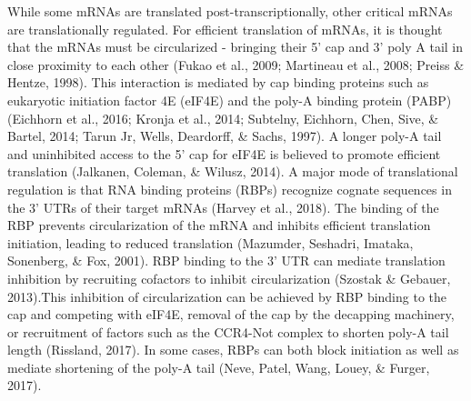 \documentclass[12pt,oneside]{reedthesis}
\begin{document}
While some mRNAs are translated post-transcriptionally, other critical
mRNAs are translationally regulated. For efficient translation of mRNAs,
it is thought that the mRNAs must be circularized - bringing their 5'
cap and 3' poly A tail in close proximity to each other (Fukao et al., 2009; Martineau et al., 2008; Preiss \& Hentze, 1998). This interaction is mediated by cap
binding proteins such as eukaryotic initiation factor 4E (eIF4E) and the
poly-A binding protein (PABP)(Eichhorn et al., 2016; Kronja et al., 2014; Subtelny, Eichhorn, Chen, Sive, \& Bartel, 2014; Tarun Jr, Wells, Deardorff, \& Sachs, 1997). A longer poly-A tail and uninhibited
access to the 5' cap for eIF4E is believed to promote efficient
translation (Jalkanen, Coleman, \& Wilusz, 2014). A major mode of translational
regulation is that RNA binding proteins (RBPs) recognize cognate
sequences in the 3' UTRs of their target mRNAs (Harvey et al., 2018). The
binding of the RBP prevents circularization of the mRNA and inhibits
efficient translation initiation, leading to reduced translation
(Mazumder, Seshadri, Imataka, Sonenberg, \& Fox, 2001). RBP binding to the 3' UTR can mediate translation
inhibition by recruiting cofactors to inhibit circularization
(Szostak \& Gebauer, 2013).This inhibition of circularization can be achieved by
RBP binding to the cap and competing with eIF4E, removal of the cap by
the decapping machinery, or recruitment of factors such as the CCR4-Not
complex to shorten poly-A tail length (Rissland, 2017). In some
cases, RBPs can both block initiation as well as mediate shortening of
the poly-A tail (Neve, Patel, Wang, Louey, \& Furger, 2017).
\end{document}
